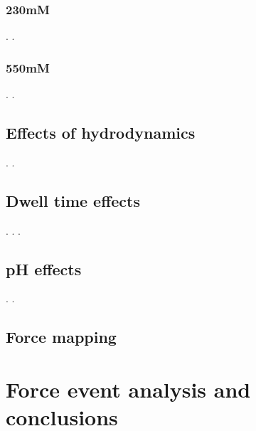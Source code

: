 \newpage

\subsection{230mM}
.
\newpage.
\newpage

\subsection{550mM}
.
\newpage.
\newpage

\section{Effects of hydrodynamics}
.
\newpage.
\newpage

\section{Dwell time effects}
.
\newpage.
\newpage.
\newpage

\section{pH effects}
.
\newpage.
\newpage

\section{Force mapping}

\chapter{Force event analysis and conclusions}
\newpage